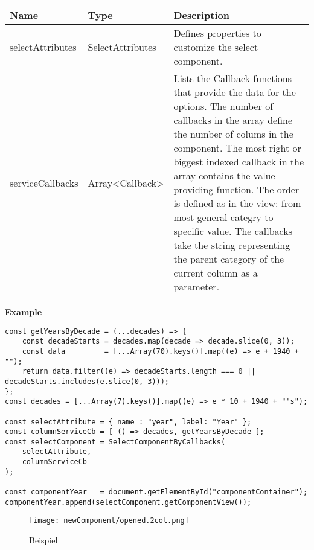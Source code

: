 \begin{table}[!htb] 
    \label{api:selectComponentByCallbacksParameter}
    \footnotesize
    \setlength\extrarowheight{4pt}
    \begin{tabular}{ p{3.5cm} p{3.5cm} p{5.5cm} }
        \toprule[1.2pt]
        \textbf{Name}    & \textbf{Type}    & \textbf{Description} \\
        \midrule
        selectAttributes & SelectAttributes & Defines properties to customize the select component. \\
        serviceCallbacks & Array<Callback>  & Lists the Callback functions that provide the data for the options. 
                                              The number of callbacks in the array define the number of colums in the component. 
                                              The most right or biggest indexed callback in the array contains the value providing function. 
                                              The order is defined as in the view: from most general categry to specific value.
        The callbacks take the string representing the parent category of the current column as a parameter. \\
        \bottomrule[1.2pt]
    \end{tabular}
\end{table}

\vspace*{6pt}
\noindent
\textbf{Example}

\begin{lstlisting}[style = htmlcssjs, label = api:selectComponentCbExample]
const getYearsByDecade = (...decades) => {
    const decadeStarts = decades.map(decade => decade.slice(0, 3));
    const data         = [...Array(70).keys()].map((e) => e + 1940 + "");
    return data.filter((e) => decadeStarts.length === 0 || decadeStarts.includes(e.slice(0, 3)));
};
const decades = [...Array(7).keys()].map((e) => e * 10 + 1940 + "'s");

const selectAttribute = { name : "year", label: "Year" };
const columnServiceCb = [ () => decades, getYearsByDecade ];
const selectComponent = SelectComponentByCallbacks(
    selectAttribute,
    columnServiceCb
);

const componentYear   = document.getElementById("componentContainer");
componentYear.append(selectComponent.getComponentView());
\end{lstlisting}
    
\begin{figure}[!htb]
    \centering
    \texttt{[image: newComponent/opened.2col.png]}
    \caption*{\centering Beispiel }
    \label{api:selectComponentCbImg}
\end{figure}


